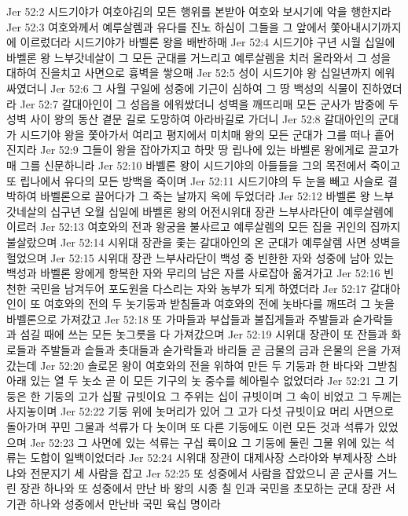 Jer 52:2  시드기야가 여호야김의 모든 행위를 본받아 여호와 보시기에 악을 행한지라
Jer 52:3  여호와께서 예루살렘과 유다를 진노 하심이 그들을 그 앞에서 쫓아내시기까지에 이르렀더라 시드기야가 바벨론 왕을 배반하매
Jer 52:4  시드기야 구년 시월 십일에 바벨론 왕 느부갓네살이 그 모든 군대를 거느리고 예루살렘을 치러 올라와서 그 성을 대하여 진을치고 사면으로 흉벽을 쌓으매
Jer 52:5  성이 시드기야 왕 십일년까지 에워싸였더니
Jer 52:6  그 사월 구일에 성중에 기근이 심하여 그 땅 백성의 식물이 진하였더라
Jer 52:7  갈대아인이 그 성읍을 에워쌌더니 성벽을 깨뜨리매 모든 군사가 밤중에 두 성벽 사이 왕의 동산 곁문 길로 도망하여 아라바길로 가더니
Jer 52:8  갈대아인의 군대가 시드기야 왕을 쫓아가서 여리고 평지에서 미치매 왕의 모든 군대가 그를 떠나 흩어진지라
Jer 52:9  그들이 왕을 잡아가지고 하맛 땅 립나에 있는 바벨론 왕에게로 끌고가매 그를 신문하니라
Jer 52:10  바벨론 왕이 시드기야의 아들들을 그의 목전에서 죽이고 또 립나에서 유다의 모든 방백을 죽이며
Jer 52:11  시드기야의 두 눈을 빼고 사슬로 결박하여 바벨론으로 끌어다가 그 죽는 날까지 옥에 두었더라
Jer 52:12  바벨론 왕 느부갓네살의 십구년 오월 십일에 바벨론 왕의 어전시위대 장관 느부사라단이 예루살렘에 이르러
Jer 52:13  여호와의 전과 왕궁을 불사르고 예루살렘의 모든 집을 귀인의 집까지 불살랐으며
Jer 52:14  시위대 장관을 좇는 갈대아인의 온 군대가 예루살렘 사면 성벽을 헐었으며
Jer 52:15  시위대 장관 느부사라단이 백성 중 빈한한 자와 성중에 남아 있는 백성과 바벨론 왕에게 항복한 자와 무리의 남은 자를 사로잡아 옮겨가고
Jer 52:16  빈천한 국민을 남겨두어 포도원을 다스리는 자와 농부가 되게 하였더라
Jer 52:17  갈대아인이 또 여호와의 전의 두 놋기둥과 받침들과 여호와의 전에 놋바다를 깨뜨려 그 놋을 바벨론으로 가져갔고
Jer 52:18  또 가마들과 부삽들과 불집게들과 주발들과 숟가락들과 섬길 때에 쓰는 모든 놋그릇을 다 가져갔으며
Jer 52:19  시위대 장관이 또 잔들과 화로들과 주발들과 솥들과 촛대들과 숟가락들과 바리들 곧 금물의 금과 은물의 은을 가져갔는데
Jer 52:20  솔로몬 왕이 여호와의 전을 위하여 만든 두 기둥과 한 바다와 그받침 아래 있는 열 두 놋소 곧 이 모든 기구의 놋 중수를 헤아릴수 없었더라
Jer 52:21  그 기둥은 한 기둥의 고가 십팔 규빗이요 그 주위는 십이 규빗이며 그 속이 비었고 그 두께는 사지놓이며
Jer 52:22  기둥 위에 놋머리가 있어 그 고가 다섯 규빗이요 머리 사면으로 돌아가며 꾸민 그물과 석류가 다 놋이며 또 다른 기둥에도 이런 모든 것과 석류가 있었으며
Jer 52:23  그 사면에 있는 석류는 구십 륙이요 그 기둥에 둘린 그물 위에 있는 석류는 도합이 일백이었더라
Jer 52:24  시위대 장관이 대제사장 스라야와 부제사장 스바냐와 전문지기 세 사람을 잡고
Jer 52:25  또 성중에서 사람을 잡았으니 곧 군사를 거느린 장관 하나와 또 성중에서 만난 바 왕의 시종 칠 인과 국민을 초모하는 군대 장관 서기관 하나와 성중에서 만난바 국민 육십 명이라
